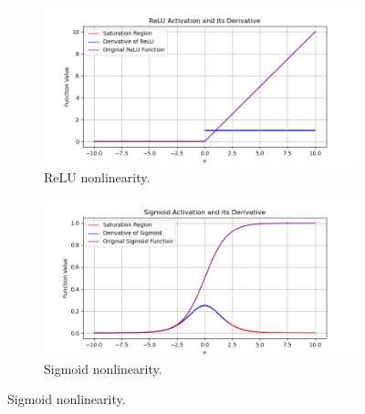         \begin{figure}[htbp]
          \centering
          \begin{subfigure}{0.49\textwidth}
            \includegraphics[width=\linewidth]{images/methods_mono/batch_norm/relu.png}
            
            \caption{ReLU nonlinearity.}
            \label{fig:image1}
          \end{subfigure}
          \hfill
          \begin{subfigure}{0.49\textwidth}
            \includegraphics[width=\linewidth]{images/methods_mono/batch_norm/sigmoid.png}
            \caption{Sigmoid nonlinearity.}
            \label{fig:image2}
          \end{subfigure}
        
          \medskip
        

\end{figure}
